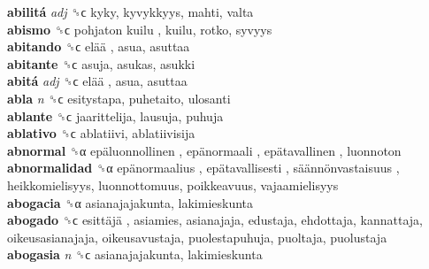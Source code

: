 \textbf{abilitá} \emph{adj}  ␝ϲ  kyky, kyvykkyys, mahti, valta  \\
\textbf{abismo} ␝ϲ   pohjaton kuilu , kuilu, rotko, syvyys  \\
\textbf{abitando} ␝ϲ   elää , asua, asuttaa  \\
\textbf{abitante} ␝ϲ  asuja, asukas, asukki  \\
\textbf{abitá} \emph{adj}  ␝ϲ   elää , asua, asuttaa  \\
\textbf{abla} \emph{n}  ␝ϲ  esitystapa, puhetaito, ulosanti  \\
\textbf{ablante} ␝ϲ  jaarittelija, lausuja, puhuja  \\
\textbf{ablativo} ␝ϲ  ablatiivi, ablatiivisija  \\
\textbf{abnormal} ␝α   epäluonnollinen ,  epänormaali ,  epätavallinen , luonnoton  \\
\textbf{abnormalidad} ␝α   epänormaalius ,  epätavallisesti ,  säännönvastaisuus , heikkomielisyys, luonnottomuus, poikkeavuus, vajaamielisyys  \\
\textbf{abogacia} ␝α  asianajajakunta, lakimieskunta  \\
\textbf{abogado} ␝ϲ   esittäjä , asiamies, asianajaja, edustaja, ehdottaja, kannattaja, oikeusasianajaja, oikeusavustaja, puolestapuhuja, puoltaja, puolustaja  \\
\textbf{abogasia} \emph{n}  ␝ϲ  asianajajakunta, lakimieskunta  \\
